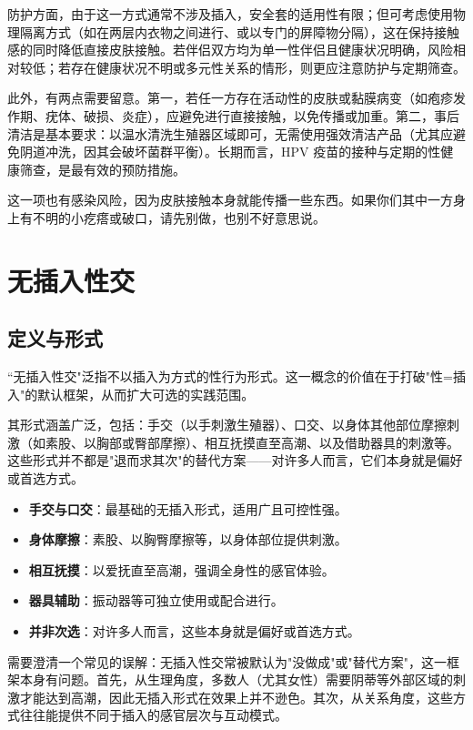 \documentclass[12pt,UTF8]{ctexbook}
\newcommand{\keyword}[1]{\textbf{#1}}
\begin{document}
防护方面，由于这一方式通常不涉及插入，安全套的适用性有限；但可考虑使用物理隔离方式（如在两层内衣物之间进行、或以专门的屏障物分隔），这在保持接触感的同时降低直接皮肤接触。若伴侣双方均为单一性伴侣且健康状况明确，风险相对较低；若存在健康状况不明或多元性关系的情形，则更应注意防护与定期筛查。

此外，有两点需要留意。第一，若任一方存在活动性的皮肤或黏膜病变（如疱疹发作期、疣体、破损、炎症），应避免进行直接接触，以免传播或加重。第二，事后清洁是基本要求：以温水清洗生殖器区域即可，无需使用强效清洁产品（尤其应避免阴道冲洗，因其会破坏菌群平衡）。长期而言，HPV 疫苗的接种与定期的性健康筛查，是最有效的预防措施。

\begin{tcolorbox}[colback=pink!5!white,colframe=red!50!black,title=贴心小叮咛]
	这一项也有感染风险，因为皮肤接触本身就能传播一些东西。如果你们其中一方身上有不明的小疙瘩或破口，请先别做，也别不好意思说。
\end{tcolorbox}

\section{无插入性交}
\subsection{定义与形式}

“无插入性交"泛指不以插入为方式的性行为形式。这一概念的价值在于打破"性=插入"的默认框架，从而扩大可选的实践范围。

其形式涵盖广泛，包括：手交（以手刺激生殖器）、口交、以身体其他部位摩擦刺激（如素股、以胸部或臀部摩擦）、相互抚摸直至高潮、以及借助器具的刺激等。这些形式并不都是"退而求其次"的替代方案——对许多人而言，它们本身就是偏好或首选方式。

\begin{itemize}
	\item \keyword{手交与口交}：最基础的无插入形式，适用广且可控性强。
	\item \keyword{身体摩擦}：素股、以胸臀摩擦等，以身体部位提供刺激。
	\item \keyword{相互抚摸}：以爱抚直至高潮，强调全身性的感官体验。
	\item \keyword{器具辅助}：振动器等可独立使用或配合进行。
	\item \keyword{并非次选}：对许多人而言，这些本身就是偏好或首选方式。
\end{itemize}

需要澄清一个常见的误解：无插入性交常被默认为"没做成"或"替代方案"，这一框架本身有问题。首先，从生理角度，多数人（尤其女性）需要阴蒂等外部区域的刺激才能达到高潮，因此无插入形式在效果上并不逊色。其次，从关系角度，这些方式往往能提供不同于插入的感官层次与互动模式。
\end{document}
